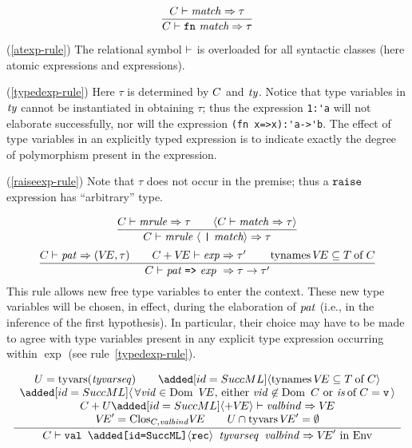 \begin{equation}        %
\frac{\C\ts\match\ra\tau}
     {\C\ts\fnexp\ra\tau}
\end{equation}
\comments
\begin{description}
\item{(\ref{atexp-rule})}
The relational symbol $\vdash$ is overloaded for all syntactic classes (here
atomic expressions and expressions).
\item{(\ref{typedexp-rule})}
Here $\tau$ is determined by $C$ and ${\it ty}$. Notice that type variables
in ${\it ty}$ cannot be instantiated in obtaining $\tau$; thus the expression
\verb+1:'a+ will not elaborate successfully, nor will the expression
\verb+(fn x=>x):'a->'b+.
The effect of type variables in an explicitly typed expression is
to indicate exactly the degree of polymorphism present in the expression.
\item{(\ref{raiseexp-rule})}
Note that $\tau$ does not occur in the premise; thus a ${\tt raise}$
expression has ``arbitrary'' type.
\end{description}
%
\begin{equation}        %
\frac{\C\ts\mrule\ra\tau\qquad\langle\C\ts\match\ra\tau\rangle}
     {\C\ts\longmatch\ra\tau}\index{28.1}
\end{equation}
\begin{equation}        %
\label{mrule-rule}
\frac{\C\ts\pat\ra(\VE,\tau)\qquad\C+\VE\ts\exp\ra\tau'\qquad\TyNamesFcn\VE\subseteq\of{\T}{\C}}
     {\C\ts\longmrule\ \ra\tau\rightarrow\tau'}
\end{equation}%
\comment  This rule allows new free type variables to enter
the context. These new type variables will be chosen, in effect, during
the elaboration of ${\it pat}$ (i.e., in the inference of the first
hypothesis). In particular, their choice may have to be made to
agree with type variables present in any explicit type expression
occurring within $\exp$ (see rule~\ref{typedexp-rule}).

%
%
\begin{equation}        %
\label{valdec-rule}
\frac{\begin{array}{c}
      U = \TyVarsFcn (\tyvarseq) \qquad \ADD{\langle \TyNamesFcn\VE\subseteq\of{\T}{\C} \rangle} \\
      \ADD{\langle\,\forall\vid\in\Dom\ \VE,\,\mbox{either $\vid\not\in\Dom\ C$ or $\of{\is}{\C} = \isv$}\,\rangle} \\
     \plusmap{\C}{\U}\ADD{\langle+\VE\rangle}\ts\valbind\ra\VE \\
      \VE'=\cl{\C,\valbind}{\VE}\qquad
      \U\cap\TyVarFcn\VE'=\emptyset
      \end{array}}
     {\C\ts\boxml{val \ADD{$\langle$rec$\rangle$} $\tyvarseq$ $\valbind$}\ra\VE'\ \In\ \Env}\index{28.2}
\end{equation}

